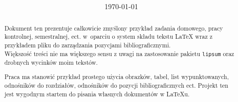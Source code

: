 \documentclass[12pt, oneside, a4paper]{article}
\title{
	\LARGE{\globalFullUniversity}\\
	\vspace{0,3cm}
	\Large{\globalDepartment}\\
    \vspace{3cm}
	\Huge{\globalFullTitle}
	\vspace{2cm}
}
\author{\globalFullAuthor}
\date{\today}
\theoremstyle{plain}
\theoremstyle{definition}
\theoremstyle{remark}
\begin{document}
\nocite{*}     %
\maketitle     %
\vspace{1cm}

\begin{abstract}
Dokument ten prezentuje całkowicie zmyślony przykład zadania domowego, pracy kontrolnej, semestralnej, ect. w~oparciu o system składu tekstu \LaTeX{} wraz z przykładem pliku do zarządzania pozycjami bibliograficznymi.\\ 
Większość treści nie ma większego sensu z uwagi na zastosowanie pakietu \texttt{lipsum} oraz drobnych wycinków moim tekstów.

Praca ma stanowić przykład prostego użycia obrazków, tabel, list wypunktowanych, odnośników do rozdziałów,  odnośników do pozycji bibliograficznych ect. Projekt ten jest wygodnym startem do pisania własnych dokumentów w LaTeXu.
\end{abstract}

\clearpage
\tableofcontents     %


%



\listoffigures
\clearpage
\printbibliography
\end{document}
